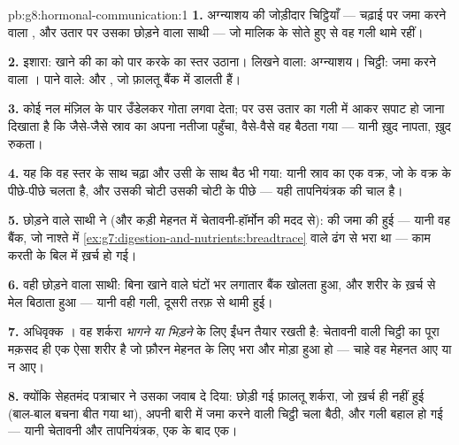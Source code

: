 \begin{solution}{pb:g8:hormonal-communication:1}
\textbf{1.} अग्न्याशय की जोड़ीदार चिट्ठियाँ --- चढ़ाई पर जमा करने वाला
, और उतार पर उसका छोड़ने वाला साथी --- जो मालिक के सोते हुए
 से वह गली थामे रहीं।

\textbf{2.} इशारा: खाने की  का  को पार करके  का
स्तर उठाना। लिखने वाला: अग्न्याशय। चिट्ठी: जमा करने वाला । पाने
वाले:  और , जो फ़ालतू बैंक में डालती हैं।

\textbf{3.} कोई नल मंज़िल के पार उँडेलकर गोता लगवा देता; पर उस उतार का
गली में आकर सपाट हो जाना दिखाता है कि जैसे-जैसे स्राव का अपना नतीजा
पहुँचा, वैसे-वैसे वह बैठता गया --- यानी ख़ुद नापता, ख़ुद रुकता।

\textbf{4.} यह कि वह स्तर के साथ चढ़ा और उसी के साथ बैठ भी गया: यानी
स्राव का एक वक्र, जो  के वक्र के पीछे-पीछे चलता है, और उसकी चोटी
उसकी चोटी के पीछे --- यही तापनियंत्रक की चाल है।

\textbf{5.} छोड़ने वाले साथी ने (और कड़ी मेहनत में चेतावनी-हॉर्मोन की
मदद से):  की जमा की हुई  --- यानी वह बैंक, जो नाश्ते में
\cref{ex:g7:digestion-and-nutrients:breadtrace} वाले ढंग से भरा था ---
काम करती  के बिल में ख़र्च हो गई।

\textbf{6.} वही छोड़ने वाला साथी: बिना खाने वाले घंटों भर लगातार बैंक
खोलता हुआ, और शरीर के ख़र्च से मेल बिठाता हुआ --- यानी वही गली, दूसरी
तरफ़ से थामी हुई।

\textbf{7.} अधिवृक्क । वह शर्करा \emph{भागने या भिड़ने} के लिए
ईंधन तैयार रखती है: चेतावनी वाली चिट्ठी का पूरा मक़सद ही एक ऐसा शरीर है
जो फ़ौरन मेहनत के लिए भरा और मोड़ा हुआ हो --- चाहे वह मेहनत आए या न
आए।

\textbf{8.} क्योंकि सेहतमंद पत्राचार ने उसका जवाब दे दिया: छोड़ी गई
फ़ालतू शर्करा, जो ख़र्च ही नहीं हुई (बाल-बाल बचना बीत गया था), अपनी बारी
में जमा करने वाली चिट्ठी चला बैठी, और गली बहाल हो गई --- यानी चेतावनी और
तापनियंत्रक, एक के बाद एक।


\end{solution}
